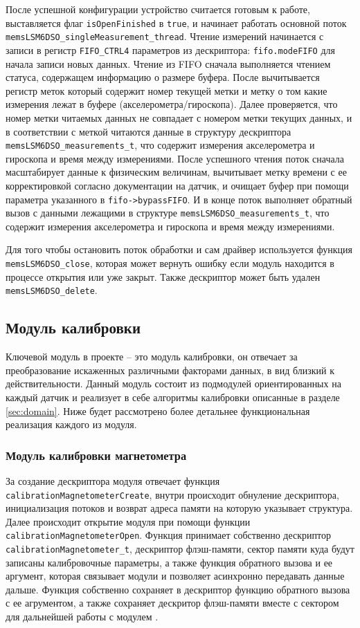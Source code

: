 После успешной конфигурации устройство считается готовым к работе, выставляется флаг \lstinline{isOpenFinished} в \lstinline{true}, и начинает
работать основной поток \lstinline{memsLSM6DSO_singleMeasurement_thread}. Чтение измерений начинается с записи в регистр \lstinline{FIFO_CTRL4}
параметров из дескриптора: \lstinline{fifo.modeFIFO} для начала записи новых данных.
Чтение из FIFO сначала выполняется чтением статуса, содержащем информацию о размере буфера. После вычитывается регистр меток
который содержит номер текущей метки и метку о том какие измерения лежат в буфере (акселерометра/гироскопа). 
Далее проверяется, что номер метки читаемых данных не совпадает с номером метки текущих данных,
и в соответствии с меткой читаются данные в структуру дескриптора \lstinline{memsLSM6DSO_measurements_t}, что содержит измерения акселерометра и гироскопа и время между измерениями.
После успешного чтения поток сначала масштабирует данные к физическим величинам, вычитывает
метку времени с ее корректировкой согласно документации на датчик, и очищает буфер при помощи параметра указанного в \lstinline{fifo->bypassFIFO}.
И в конце поток выполняет обратный вызов с данными лежащими в структуре \lstinline{memsLSM6DSO_measurements_t}, что содержит измерения акселерометра и гироскопа и время между измерениями.

Для того чтобы остановить поток обработки и сам драйвер используется функция \lstinline{memsLSM6DSO_close}, которая может вернуть ошибку если модуль находится в процессе открытия
или уже закрыт. Также дескриптор может быть удален \lstinline{memsLSM6DSO_delete}.

\subsection{Модуль калибровки}

Ключевой модуль в проекте -- это модуль калибровки, он отвечает за преобразование искаженных различными факторами данных, в вид близкий к действительности. 
Данный модуль состоит из подмодулей ориентированных на каждый датчик и реализует в себе алгоритмы калибровки описанные в разделе \ref{sec:domain}.
Ниже будет рассмотрено более детальнее функциональная реализация каждого из модуля.

\subsubsection{Модуль калибровки магнетометра}

За создание дескриптора модуля отвечает функция \lstinline{calibrationMagnetometerCreate}, внутри происходит обнуление дескриптора,
инициализация потоков и возврат адреса памяти на которую указывает структура. Далее происходит открытие модуля при помощи функции 
\lstinline{calibrationMagnetometerOpen}. Функция принимает собственно дескриптор \lstinline{calibrationMagnetometer_t},
дескриптор флэш-памяти, сектор памяти куда будут записаны калибровочные параметры, а также функция обратного вызова и ее аргумент, 
которая связывает модули и позволяет асинхронно передавать данные дальше. Функция собственно сохраняет в дескриптор функцию обратного вызова с ее агрументом,
а также сохраняет дескритор флэш-памяти вместе с сектором для дальнейшей работы с модулем \moduleFlashMemory. 

